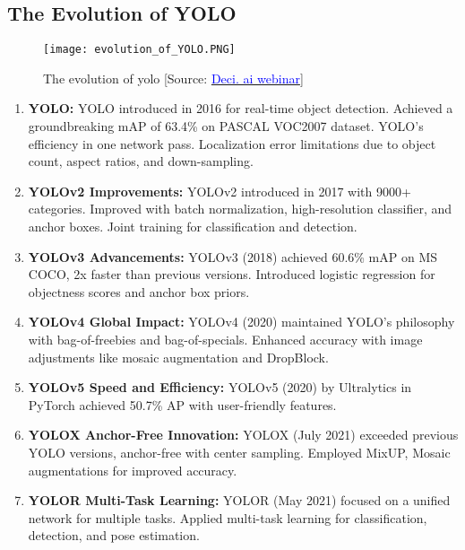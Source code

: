 \subsection{The Evolution of YOLO}
\begin{figure}[H]
    \centering
    \texttt{[image: evolution\_of\_YOLO.PNG]}
    \caption{The evolution  of yolo [Source: \href{https://deci.ai/resources/webinar-open-source-llms-vs-apis/}{\textcolor{blue}{Deci. ai webinar}}]}
    \label{fig:YOLO-Evolution}
\end{figure}
\begin{enumerate}
    \item \textbf{YOLO: } YOLO introduced in 2016 for real-time object detection.
    Achieved a groundbreaking mAP of 63.4\% on PASCAL VOC2007 dataset.
    YOLO's efficiency in one network pass.
    Localization error limitations due to object count, aspect ratios, and down-sampling. \cite{redmon2016you}\\
    \item \textbf{YOLOv2 Improvements: } YOLOv2 introduced in 2017 with 9000+ categories.
    Improved with batch normalization, high-resolution classifier, and anchor boxes.
    Joint training for classification and detection.\cite{sang2018improved}\\
    \item \textbf{YOLOv3 Advancements: } YOLOv3 (2018) achieved 60.6\% mAP on MS COCO, 2x faster than previous versions.
    Introduced logistic regression for objectness scores and anchor box priors. \cite{redmon2018yolov3}\\
    \item \textbf{YOLOv4 Global Impact: } YOLOv4 (2020) maintained YOLO's philosophy with bag-of-freebies and bag-of-specials. Enhanced accuracy with image adjustments like mosaic augmentation and DropBlock. \cite{gai2023detection}
    \item \textbf{YOLOv5 Speed and Efficiency: } YOLOv5 (2020) by Ultralytics in PyTorch achieved 50.7\% AP with user-friendly features. \cite{wu2021real}\\
    \item \textbf{YOLOX Anchor-Free Innovation: } YOLOX (July 2021) exceeded previous YOLO versions, anchor-free with center sampling. Employed MixUP, Mosaic augmentations for improved accuracy. \cite{ge2021yolox}\\
    \item \textbf{YOLOR Multi-Task Learning: } YOLOR (May 2021) focused on a unified network for multiple tasks.
    Applied multi-task learning for classification, detection, and pose estimation.\\


\end{enumerate}
